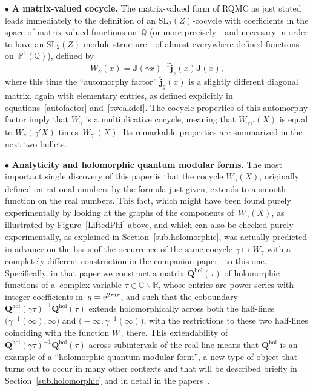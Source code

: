 \documentclass[pdftex]{sigma}
\numberwithin{equation}{section}
\def\BP{\mathbb P}
\def\BJ{\mathbb J}
\def\l{\lambda}
\def\wt{\widetilde}
\def\SL{\mathrm{SL}}
\def\l{\lambda}
\def\R{\mathbb R}
\def\C{\mathbb C}
\def\Q{\mathbb Q}
\def\i{^{-1}}
\def\l{\lambda}
\def\BJ{{\mathbf Q}} %
\def\ssm{\smallsetminus}
\def\g{\gamma}
\def\bJ{J} \def\bJ{\mathbf{J}}
\def\hol{\mathrm{hol}}
\def\jp{\mathbf{j}}
\def\jt{\jp_\l} %
\def\jt{\jp_{\text{tw}}} %
\def\jt{\jp_{\textsf T}} %
\def\jt{\jp^{(\l)}}
\def\jt{\jp^{(\l)}}
\def\jt{\wt{\jp}}
\def\bPsi{\BJ}
\begin{document}
$\bullet$ {\bf A matrix-valued cocycle.}
The matrix-valued form of RQMC as
just stated leads immediately to the definition of an $\SL_2(Z)$-cocycle with
coefficients in the space of matrix-valued functions on~$\Q$ (or more precisely---and
necessary in order to have an $\SL_2(Z)$-module structure---of almost-everywhere-defined
functions on~$\BP^1(\Q)$), defined by
\[
W_\g(x) = \bJ(\g x)^{-1} \jt_\g(x)  \bJ(x),
\]
where this time the ``automorphy factor'' $\jt_g(x)$ is a slightly different diagonal
matrix, again with elementary entries, as defined explicitly in
equations~\eqref{autofactor} and~\eqref{tweakdef}. The cocycle properties of this
automorphy factor imply that $W_\g$ is a multiplicative cocycle, meaning that
$W_{\g\g'}(X)$ is equal to $W_\g(\g'X)$ times~$W_{\g'}(X)$. Its remarkable properties are
summarized in the next two bullets.

$\bullet$ {\bf Analyticity and holomorphic quantum modular forms.}
The most important single discovery of this paper is that the cocycle
$W_\g(X)$, originally defined on rational numbers by the formula just given, extends
to a smooth function on the real numbers. This fact, which might have been found
purely experimentally by looking at the graphs of the components of~$W_\g(X)$, as
illustrated by Figure~\ref{LiftedPhi} above, and which can also be checked purely
experimentally, as explained in Section~\ref{sub.holomorphic}, was actually predicted
in advance on the basis of the occurrence of the same cocycle $\g\mapsto W_\g$
with a completely different construction in the companion paper~\cite{GZ:qseries}
to this one. Specifically, in that paper we construct a matrix $\bPsi^\hol(\tau)$ of
holomorphic functions of a~complex variable $\tau\in\C\ssm\R$, whose entries are power
series with integer coefficients in~$q={\rm e}^{2\pi{\rm i}\tau}$, and such that the coboundary
$\bPsi^\hol(\g \tau)\i\bPsi^\hol(\tau)$ extends holomorphically across
both the half-lines~${\big(\g\i(\infty),\infty\big)}$ and $\bigl(-\infty,\g\i(\infty)\bigr)$, with the
restrictions to these two half-lines coinciding with the function $W_\g$ there.
This extendability of $\bPsi^\hol(\g \tau)\i\bPsi^\hol(\tau)$ across subintervals
of the real line means that $\BJ^\hol$ is an example of a ``holomorphic quantum modular
form'', a new type of object that turns out to occur in many other contexts and that
will be described briefly in Section~\ref{sub.holomorphic} and in detail in the
papers~\cite{GZ:qseries,Z:HQMF}.
\end{document}
